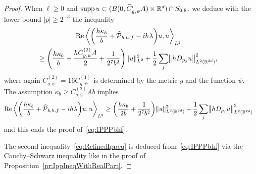 \documentclass[AHL,Unicode,longabstracts]{cedram}
\newcommand{\R}{\mathbb{R}}
\newcommand{\clP}{\mathcal{P}}
\DeclareMathOperator{\Ree}{Re}
\DeclareMathOperator{\suppp}{supp}
\let\oldhat\hat
\renewcommand*{\hat}[1]{\mathchoice{\widehat{#1}}{\widehat{#1}}{\oldhat{#1}}{\oldhat{#1}}}
\let\originalleft\left
\let\originalright\right
\renewcommand{\left}{\mathopen{}\mathclose\bgroup\originalleft}
\renewcommand{\right}{\aftergroup\egroup\originalright}
\begin{document}
\begin{proof}
When $\ell\geq 0$ and $\suppp u\subset (B(0,\hat{C}'_{g,\psi}A)\times \R^d)\cap S_{0,8}$, we deduce with the lower bound $|p|\geq 2^{-3}$ the inequality
\begin{multline*}
\Ree\, \left\langle \left(\frac{h\kappa_b}{b} + \hat{\clP}_{b,h,f}-i h\lambda \right) u, u \right\rangle_{L^2} \\
\geq \left(\frac{h\kappa_b}{b}- \frac{hC_{g,\psi}^{(2)}A}{2} + \frac{1}{2^7b^{2}}\right) \|u\|_{L^2}^2
+ \frac{1}{2} \sum_j \left\| hD_{p_j} u \right\|_{L^2(\R^{2d})}^2,
\end{multline*}
where again $C_{g,\psi}^{(2)}=16 C_{g,\psi}^{(1)}$ is determined by the metric $g$ and the function $\psi$. The assumption $\kappa_{b}\geq C_{g,\psi}^{(2)}Ab$ implies
\[
\Ree\, \left\langle \left(\frac{h\kappa_b}{b} + \hat{\clP}_{b,h,f}-i h\lambda \right) u, u \right\rangle_{L^2} \geq \left(\frac{h\kappa_b}{2b}+\frac{1}{2^7b^{2}}\right) \|u\|_{L^2(\R^{2d})}^2 + \frac{1}{2} \sum_j \left\| hD_{p_j} u \right\|_{L^2(\R^{2d})}^2
\]
and this ends the proof of~\eqref{eq:IPPPbhf}.

The second inequality~\eqref{eq:RefinedIppeq} is deduced from~\eqref{eq:IPPPbhf} via the Cauchy--Schwarz inequality like in the proof of Proposition~\ref{pr:IppIneqWithRealPart}.
\end{proof}
\end{document}
